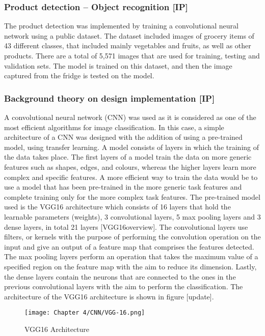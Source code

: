 \subsubsection{Product detection – Object recognition [IP]}

The product detection was implemented by training a convolutional neural network using a public dataset.
The dataset included images of grocery items of 43 different classes, that included mainly vegetables and fruits, as well as other products.
There are a total of 5,571 images that are used for training, testing and validation sets.
The model is trained on this dataset, and then the image captured from the fridge is tested on the model.

\subsubsection{Background theory on design implementation [IP]}

A convolutional neural network (CNN) was used as it is considered as one of the most efficient algorithms for image classification.
In this case, a simple architecture of a CNN was designed with the addition of using a pre-trained model, using transfer learning.
A model consists of layers in which the training of the data takes place.
The first layers of a model train the data on more generic features such as shapes, edges, and colours, whereas the higher layers learn more complex and specific features.
A more efficient way to train the data would be to use a model that has been pre-trained in the more generic task features and complete training only for the more complex task features.
The pre-trained model used is the VGG16 architecture which consists of 16 layers that hold the learnable parameters (weights), 3 convolutional layers, 5 max pooling layers and 3 dense layers, in total 21 layers [VGG16overview].
The convolutional layers use filters, or kernels with the purpose of performing the convolution operation on the input and give an output of a feature map that comprises the features detected.
The max pooling layers perform an operation that takes the maximum value of a specified region on the feature map with the aim to reduce its dimension.
Lastly, the dense layers contain the neurons that are connected to the ones in the previous convolutional layers with the aim to perform the classification.
The architecture of the VGG16 architecture is shown in figure [update].

\begin{figure}[H]        
    \centering
    \texttt{[image: Chapter 4/CNN/VGG-16.png]}
    \caption{VGG16 Architecture}
    \label{fig:cnn}
\end{figure} 

